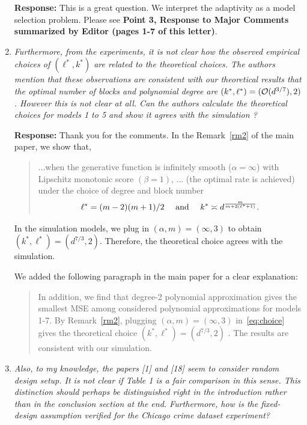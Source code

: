 \documentclass[11pt]{article}
\theoremstyle{plain}
\theoremstyle{definition}
\begin{document}
\begin{enumerate}[wide, labelwidth=!, labelindent=0pt]
    \textbf{Response:} 
  This is a great question. We interpret the adaptivity as a model selection problem. Please see \textbf{Point 3, Response to Major Comments summarized by Editor (pages 1-7 of this letter)}.
        
    \item \textit{Furthermore, from the experiments, it is not clear how the observed empirical choices of $({\ell}^*,k^*)$ are related to the theoretical choices. The authors mention that these observations are consistent with our theoretical results that the optimal number of blocks and polynomial degree are $(k^*,\ell^*) = (\mathcal{O}(d^{3/7}),2)$. However this is not clear at all. Can the authors calculate the theoretical choices for models 1 to 5 and show it agrees with the simulation ?}
    
    \textbf{Response:} 
    Thank you for the comments. In the Remark~\ref{rm2} of the main paper, we show that, 
    
    \begin{quote}
    \color{blue}...when the generative function is infinitely smooth ($\alpha =\infty$) with Lipschitz monotonic score $(\beta=1)$, ... (the optimal rate is achieved) under the choice of degree and block number
\[
\ell^*= {(m-2)(m+1)/2}\quad \text{ and } \quad k^* \asymp d^{m\over m +2(\ell^*+1)}.
\]
\end{quote}

In the simulation models, we plug in $(\alpha, m)=(\infty, 3)$ to obtain $(k^*,\ell^*) = (d^{7/3},2)$. Therefore, the theoretical choice agrees with the simulation. 

We added the following paragraph in the main paper for a clear explanation:       
    \begin{quote}
In addition, we find that degree-2 polynomial approximation gives the smallest MSE {\color{blue}among considered polynomial approximations for models 1-7. By Remark~\ref{rm2}, plugging $(\alpha,m)=(\infty,3)$ in~\eqref{eq:choice} gives the theoretical choice $(k^*,\ell^*)=(d^{7/3},2)$ . The results are consistent with our simulation. }
    \end{quote} 
    
    
   
    
    \item \textit{Also, to my knowledge, the papers [1] and [18] seem to consider random design setup. It is not clear if Table 1 is a fair comparison in this sense. This distinction should perhaps be distinguished right in the introduction rather than in the conclusion section at the end. Furthermore, how is the fixed-design assumption verified for the Chicago crime dataset experiment?}
    

\end{enumerate}
\end{document}
